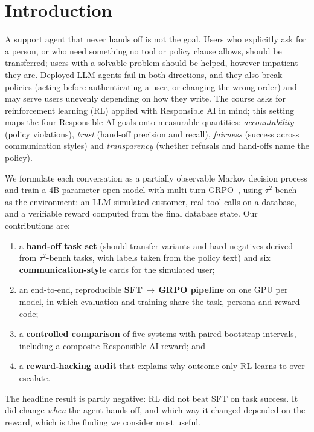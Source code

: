 \documentclass[12pt,a4paper]{article}
\newcommand{\tautwo}{$\tau^2$-bench}
\begin{document}
\setcounter{page}{1}

\section{Introduction}

A support agent that never hands off is not the goal. Users who explicitly ask
for a person, or who need something no tool or policy clause allows, should be
transferred; users with a solvable problem should be helped, however impatient
they are. Deployed LLM agents fail in both directions, and they also break
policies (acting before authenticating a user, or changing the wrong order)
and may serve users unevenly depending on how they write. The course asks for
reinforcement learning (RL) applied with Responsible AI in mind; this setting
maps the four Responsible-AI goals onto measurable quantities:
\emph{accountability} (policy violations), \emph{trust} (hand-off precision
and recall), \emph{fairness} (success across communication styles) and
\emph{transparency} (whether refusals and hand-offs name the policy).

We formulate each conversation as a partially observable Markov decision
process and train a 4B-parameter open model with multi-turn GRPO~\cite{shao2024},
using \tautwo{}~\cite{barres2025} as the environment: an LLM-simulated customer,
real tool calls on a database, and a verifiable reward computed from the
final database state. Our contributions are:
\begin{enumerate}
\item a \textbf{hand-off task set} (should-transfer variants and hard
negatives derived from \tautwo{} tasks, with labels taken from the policy text)
and six \textbf{communication-style} cards for the simulated user;
\item an end-to-end, reproducible \textbf{SFT\,$\rightarrow$\,GRPO pipeline}
on one GPU per model, in which evaluation and training share the task, persona
and reward code;
\item a \textbf{controlled comparison} of five systems with paired bootstrap
intervals, including a composite Responsible-AI reward; and
\item a \textbf{reward-hacking audit} that explains why outcome-only RL learns
to over-escalate.
\end{enumerate}
The headline result is partly negative: RL did not beat SFT on task success.
It did change \emph{when} the agent hands off, and which way it changed depended
on the reward, which is the finding we consider most useful.
\end{document}
